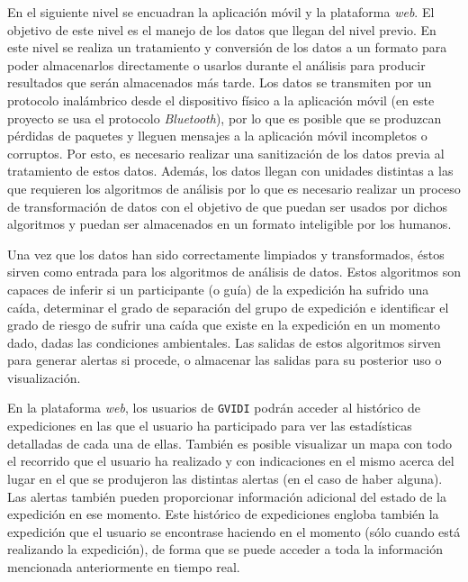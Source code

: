 En el siguiente nivel se encuadran la aplicación móvil y la plataforma \textit{web}. El objetivo de este nivel es el manejo de los datos que llegan del nivel previo. En este nivel se realiza un tratamiento y conversión de los datos a un formato para poder almacenarlos directamente o usarlos durante el análisis para producir resultados que serán almacenados más tarde. Los datos se transmiten por un protocolo inalámbrico desde el dispositivo físico a la aplicación móvil (en este proyecto se usa el protocolo \textit{Bluetooth}), por lo que es posible que se produzcan pérdidas de paquetes y lleguen mensajes a la aplicación móvil incompletos o corruptos. Por esto, es necesario realizar una sanitización de los datos previa al tratamiento de estos datos. Además, los datos llegan con unidades distintas a las que requieren los algoritmos de análisis por lo que es necesario realizar un proceso de transformación de datos con el objetivo de que puedan ser usados por dichos algoritmos y puedan ser almacenados en un formato inteligible por los humanos. 

Una vez que los datos han sido correctamente limpiados y transformados, éstos sirven como entrada para los algoritmos de análisis de datos. Estos algoritmos son capaces de inferir si un participante (o guía) de la expedición ha sufrido una caída, determinar el grado de separación del grupo de expedición e identificar el grado de riesgo de sufrir una caída que existe en la expedición en un momento dado, dadas las condiciones ambientales. Las salidas de estos algoritmos sirven para generar alertas si procede, o almacenar las salidas para su posterior uso o visualización. 

En la plataforma \textit{web}, los usuarios de \texttt{GVIDI} podrán acceder al histórico de expediciones en las que el usuario ha participado para ver las estadísticas detalladas de cada una de ellas. También es posible visualizar un mapa con todo el recorrido que el usuario ha realizado y con indicaciones en el mismo acerca del lugar en el que se produjeron las distintas alertas (en el caso de haber alguna). Las alertas también pueden proporcionar información adicional del estado de la expedición en ese momento. Este histórico de expediciones engloba también la expedición que el usuario se encontrase haciendo en el momento (sólo cuando está realizando la expedición), de forma que se puede acceder a toda la información mencionada anteriormente en tiempo real. 

